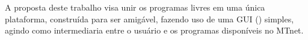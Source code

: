     A proposta deste trabalho visa unir os programas livres em uma única plataforma, construída para ser amigável, fazendo uso de uma GUI () simples, agindo como intermediaria entre o usuário e os programas disponíveis no MTnet.
    

    
    
     
    
